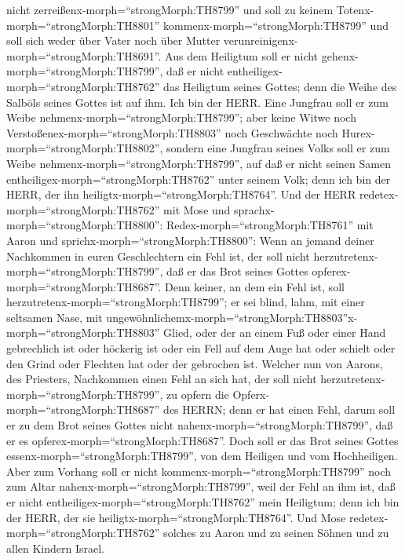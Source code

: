 nicht zerreißenx-morph=``strongMorph:TH8799''  und soll zu
keinem Totenx-morph=``strongMorph:TH8801''
kommenx-morph=``strongMorph:TH8799'' und soll sich weder über Vater noch
über Mutter verunreinigenx-morph=``strongMorph:TH8691''. 
Aus dem Heiligtum soll er nicht gehenx-morph=``strongMorph:TH8799'', daß
er nicht entheiligex-morph=``strongMorph:TH8762'' das Heiligtum seines
Gottes; denn die Weihe des Salböls seines Gottes ist auf ihm. Ich bin
der HERR.  Eine Jungfrau soll er zum Weibe
nehmenx-morph=``strongMorph:TH8799'';  aber keine Witwe
noch Verstoßenex-morph=``strongMorph:TH8803'' noch Geschwächte noch
Hurex-morph=``strongMorph:TH8802'', sondern eine Jungfrau seines Volks
soll er zum Weibe nehmenx-morph=``strongMorph:TH8799'', 
auf daß er nicht seinen Samen entheiligex-morph=``strongMorph:TH8762''
unter seinem Volk; denn ich bin der HERR, der ihn
heiligtx-morph=``strongMorph:TH8764''.  Und der HERR
redetex-morph=``strongMorph:TH8762'' mit Mose und
sprachx-morph=``strongMorph:TH8800'': 
Redex-morph=``strongMorph:TH8761'' mit Aaron und
sprichx-morph=``strongMorph:TH8800'': Wenn an jemand deiner Nachkommen
in euren Geschlechtern ein Fehl ist, der soll nicht
herzutretenx-morph=``strongMorph:TH8799'', daß er das Brot seines Gottes
opferex-morph=``strongMorph:TH8687''.  Denn keiner, an dem
ein Fehl ist, soll herzutretenx-morph=``strongMorph:TH8799''; er sei
blind, lahm, mit einer seltsamen Nase, mit
ungewöhnlichemx-morph=``strongMorph:TH8803''x-morph=``strongMorph:TH8803''
Glied,  oder der an einem Fuß oder einer Hand gebrechlich
ist  oder höckerig ist oder ein Fell auf dem Auge hat oder
schielt oder den Grind oder Flechten hat oder der gebrochen ist.
 Welcher nun von Aarons, des Priesters, Nachkommen einen
Fehl an sich hat, der soll nicht
herzutretenx-morph=``strongMorph:TH8799'', zu opfern die
Opferx-morph=``strongMorph:TH8687'' des HERRN; denn er hat einen Fehl,
darum soll er zu dem Brot seines Gottes nicht
nahenx-morph=``strongMorph:TH8799'', daß er es
opferex-morph=``strongMorph:TH8687''.  Doch soll er das
Brot seines Gottes essenx-morph=``strongMorph:TH8799'', von dem Heiligen
und vom Hochheiligen.  Aber zum Vorhang soll er nicht
kommenx-morph=``strongMorph:TH8799'' noch zum Altar
nahenx-morph=``strongMorph:TH8799'', weil der Fehl an ihm ist, daß er
nicht entheiligex-morph=``strongMorph:TH8762'' mein Heiligtum; denn ich
bin der HERR, der sie heiligtx-morph=``strongMorph:TH8764''.
 Und Mose redetex-morph=``strongMorph:TH8762'' solches zu
Aaron und zu seinen Söhnen und zu allen Kindern Israel.

